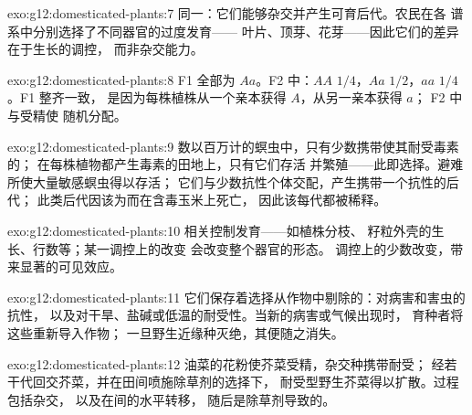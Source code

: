 \begin{solution}{exo:g12:domesticated-plants:7}
同一：它们能够杂交并产生可育后代。农民在各
谱系中分别选择了不同器官的过度发育——
叶片、顶芽、花芽——因此它们的差异在于生长的调控，
而非杂交能力。
\end{solution}

\begin{solution}{exo:g12:domesticated-plants:8}
F1 全部为 $Aa$。F2 中：$AA$ $1/4$，$Aa$ $1/2$，$aa$ $1/4$。F1 整齐一致，
是因为每株植株从一个亲本获得 $A$，从另一亲本获得 $a$；
F2 中与受精使
随机分配。
\end{solution}

\begin{solution}{exo:g12:domesticated-plants:9}
数以百万计的螟虫中，只有少数携带使其耐受毒素的；
在每株植物都产生毒素的田地上，只有它们存活
并繁殖——此即选择。避难所使大量敏感螟虫得以存活；
它们与少数抗性个体交配，产生携带一个抗性的后代；
此类后代因该为而在含毒玉米上死亡，
因此该每代都被稀释。
\end{solution}

\begin{solution}{exo:g12:domesticated-plants:10}
相关控制发育——如植株分枝、
籽粒外壳的生长、行数等；某一调控上的改变
会改变整个器官的形态。
调控上的少数改变，带来显著的可见效应。
\end{solution}

\begin{solution}{exo:g12:domesticated-plants:11}
它们保存着选择从作物中剔除的：对病害和害虫的抗性，
以及对干旱、盐碱或低温的耐受性。当新的病害或气候出现时，
育种者将这些重新导入作物；
一旦野生近缘种灭绝，其便随之消失。
\end{solution}

\begin{solution}{exo:g12:domesticated-plants:12}
油菜的花粉使芥菜受精，杂交种携带耐受；
经若干代回交芥菜，并在田间喷施除草剂的选择下，
耐受型野生芥菜得以扩散。过程包括杂交，
以及在间的水平转移，
随后是除草剂导致的。
\end{solution}

